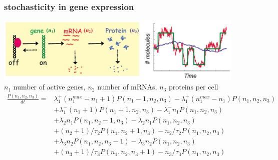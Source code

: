 \begin{frame}
\frametitle{stochasticity in gene expression}
\begin{center}
\includegraphics[width=0.9\textwidth]{fig/stochgeneexpdyn.png}\\
{\scriptsize
$n_1$ number of active genes, $n_2$ number of mRNAs, $n_3$ proteins per cell
\begin{align*}
\frac{P(n_1,n_2,n_3)}{dt} = &\lambda_1^+ (n_1^{max}-n_1 + 1)P(n_1 - 1,n_2,n_3) -\lambda_1^+ (n_1^{max}-n_1)P(n_1,n_2,n_3)\\
&+\lambda_1^- (n_1 + 1)P(n_1 + 1,n_2,n_3) -\lambda_1^- n_1 P(n_1,n_2,n_3)\\
&+\lambda_2 n_1P(n_1,n_2-1,n_3) - \lambda_2 n_1 P(n_1,n_2,n_3)\\
&+(n_2+1)/\tau_2 P(n_1,n_2+1,n_3) - n_2/\tau_2P(n_1,n_2,n_3)\\
&+\lambda_3 n_2 P(n_1,n_2,n_3 - 1) - \lambda_3 n_2 P(n_1,n_2,n_3)\\
&+(n_3 + 1)/\tau_3 P(n_1,n_2,n_3+1) - n_3/\tau_3 P(n_1,n_2,n_3)
\end{align*}}
\end{center}
\end{frame}
